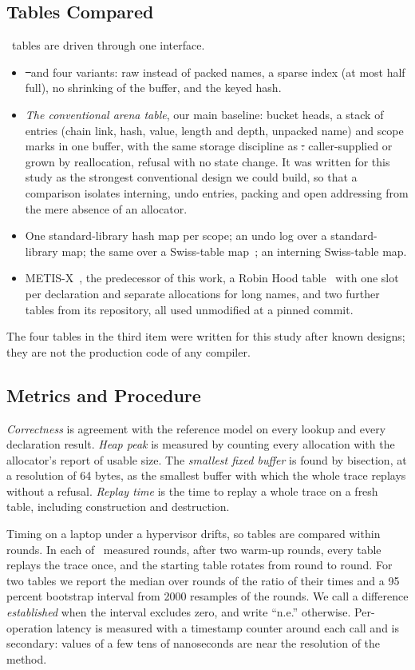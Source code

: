 \subsection{Tables Compared}
\label{sec:baselines}
\NTables\ tables are driven through one interface.
\begin{itemize}
\item \st\ and four variants: raw instead of packed names, a sparse index (at most half full), no shrinking of the buffer, and the keyed hash.
\item \emph{The conventional arena table}, our main baseline: bucket heads, a stack of entries (chain link, hash, value, length and depth, unpacked name) and scope marks in one buffer, with the same storage discipline as \st: caller-supplied or grown by reallocation, refusal with no state change. It was written for this study as the strongest conventional design we could build, so that a comparison isolates interning, undo entries, packing and open addressing from the mere absence of an allocator.
\item One standard-library hash map per scope; an undo log over a standard-library map; the same over a Swiss-table map~\cite{phmap}; an interning Swiss-table map.
\item METIS-X~\cite{metis}, the predecessor of this work, a Robin Hood table~\cite{celis1985} with one slot per declaration and separate allocations for long names, and two further tables from its repository, all used unmodified at a pinned commit.
\end{itemize}
The four tables in the third item were written for this study after known designs; they are not the production code of any compiler.

\subsection{Metrics and Procedure}
\emph{Correctness} is agreement with the reference model on every lookup and every declaration result. \emph{Heap peak} is measured by counting every allocation with the allocator's report of usable size. The \emph{smallest fixed buffer} is found by bisection, at a resolution of 64 bytes, as the smallest buffer with which the whole trace replays without a refusal. \emph{Replay time} is the time to replay a whole trace on a fresh table, including construction and destruction.

Timing on a laptop under a hypervisor drifts, so tables are compared within rounds. In each of \Rounds\ measured rounds, after two warm-up rounds, every table replays the trace once, and the starting table rotates from round to round. For two tables we report the median over rounds of the ratio of their times and a 95 percent bootstrap interval from 2000 resamples of the rounds. We call a difference \emph{established} when the interval excludes zero, and write ``n.e.'' otherwise. Per-operation latency is measured with a timestamp counter around each call and is secondary: values of a few tens of nanoseconds are near the resolution of the method.


